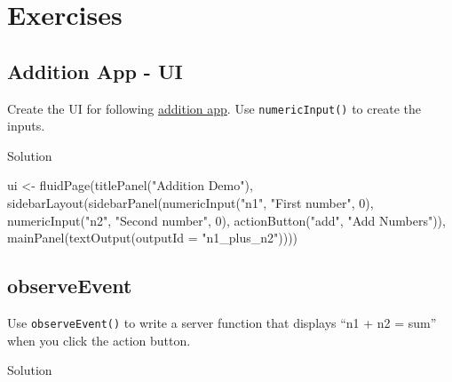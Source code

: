 \documentclass[
  oneside]{book}
\newenvironment{Shaded}{\begin{snugshade}}{\end{snugshade}}
\newcommand{\AttributeTok}[1]{\textcolor[rgb]{0.77,0.63,0.00}{#1}}
\newcommand{\DecValTok}[1]{\textcolor[rgb]{0.00,0.00,0.81}{#1}}
\newcommand{\FunctionTok}[1]{\textcolor[rgb]{0.00,0.00,0.00}{#1}}
\newcommand{\NormalTok}[1]{#1}
\newcommand{\OtherTok}[1]{\textcolor[rgb]{0.56,0.35,0.01}{#1}}
\newcommand{\StringTok}[1]{\textcolor[rgb]{0.31,0.60,0.02}{#1}}
\begin{document}
\hypertarget{exercises-first-app}{%
\section{Exercises}\label{exercises-first-app}}

\hypertarget{addition-app---ui}{%
\subsection{Addition App - UI}\label{addition-app---ui}}

Create the UI for following \href{https://shiny.psy.gla.ac.uk/debruine/add_demo/}{addition app}. Use \texttt{numericInput}\texttt{()} to create the inputs.

Solution

\begin{Shaded}
\begin{Highlighting}[]
\NormalTok{ui }\OtherTok{\textless{}{-}} \FunctionTok{fluidPage}\NormalTok{(}\FunctionTok{titlePanel}\NormalTok{(}\StringTok{"Addition Demo"}\NormalTok{), }\FunctionTok{sidebarLayout}\NormalTok{(}\FunctionTok{sidebarPanel}\NormalTok{(}\FunctionTok{numericInput}\NormalTok{(}\StringTok{"n1"}\NormalTok{,}
    \StringTok{"First number"}\NormalTok{, }\DecValTok{0}\NormalTok{), }\FunctionTok{numericInput}\NormalTok{(}\StringTok{"n2"}\NormalTok{, }\StringTok{"Second number"}\NormalTok{, }\DecValTok{0}\NormalTok{), }\FunctionTok{actionButton}\NormalTok{(}\StringTok{"add"}\NormalTok{,}
    \StringTok{"Add Numbers"}\NormalTok{)), }\FunctionTok{mainPanel}\NormalTok{(}\FunctionTok{textOutput}\NormalTok{(}\AttributeTok{outputId =} \StringTok{"n1\_plus\_n2"}\NormalTok{))))}
\end{Highlighting}
\end{Shaded}

\hypertarget{observeevent}{%
\subsection{observeEvent}\label{observeevent}}

Use \texttt{observeEvent}\texttt{()} to write a server function that displays ``n1 + n2 = sum'' when you click the action button.

Solution
\end{document}
